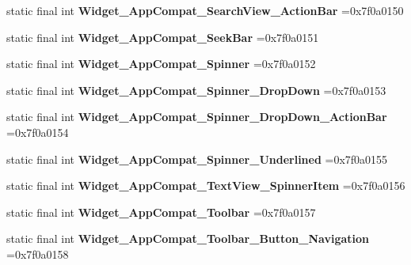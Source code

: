 \begin{DoxyCompactItemize}
static final int {\bfseries Widget\+\_\+\+App\+Compat\+\_\+\+Search\+View\+\_\+\+Action\+Bar} =0x7f0a0150
\item 
\mbox{\label{classproject4_1_1xaria_1_1R_1_1style_af424e8b5c17142547193a8c9ce5229ce}} 
static final int {\bfseries Widget\+\_\+\+App\+Compat\+\_\+\+Seek\+Bar} =0x7f0a0151
\item 
\mbox{\label{classproject4_1_1xaria_1_1R_1_1style_aaccc8261b6c8f0eab4c62b8ded11280f}} 
static final int {\bfseries Widget\+\_\+\+App\+Compat\+\_\+\+Spinner} =0x7f0a0152
\item 
\mbox{\label{classproject4_1_1xaria_1_1R_1_1style_adc42b14fde64f1f335c8381fc7b4a14a}} 
static final int {\bfseries Widget\+\_\+\+App\+Compat\+\_\+\+Spinner\+\_\+\+Drop\+Down} =0x7f0a0153
\item 
\mbox{\label{classproject4_1_1xaria_1_1R_1_1style_a732c6d29e3b0d7460f092462f9eb5b68}} 
static final int {\bfseries Widget\+\_\+\+App\+Compat\+\_\+\+Spinner\+\_\+\+Drop\+Down\+\_\+\+Action\+Bar} =0x7f0a0154
\item 
\mbox{\label{classproject4_1_1xaria_1_1R_1_1style_a851675bfd029bd19a3e9ab55721dcc86}} 
static final int {\bfseries Widget\+\_\+\+App\+Compat\+\_\+\+Spinner\+\_\+\+Underlined} =0x7f0a0155
\item 
\mbox{\label{classproject4_1_1xaria_1_1R_1_1style_aeba698e6ee662e7a6f9a28b110938dc4}} 
static final int {\bfseries Widget\+\_\+\+App\+Compat\+\_\+\+Text\+View\+\_\+\+Spinner\+Item} =0x7f0a0156
\item 
\mbox{\label{classproject4_1_1xaria_1_1R_1_1style_a58889eb192ff8b15309bfe315ed7cc6a}} 
static final int {\bfseries Widget\+\_\+\+App\+Compat\+\_\+\+Toolbar} =0x7f0a0157
\item 
\mbox{\label{classproject4_1_1xaria_1_1R_1_1style_a798da08b5d37e9f7c8fccd7c84f8aa66}} 
static final int {\bfseries Widget\+\_\+\+App\+Compat\+\_\+\+Toolbar\+\_\+\+Button\+\_\+\+Navigation} =0x7f0a0158

\end{DoxyCompactItemize}
